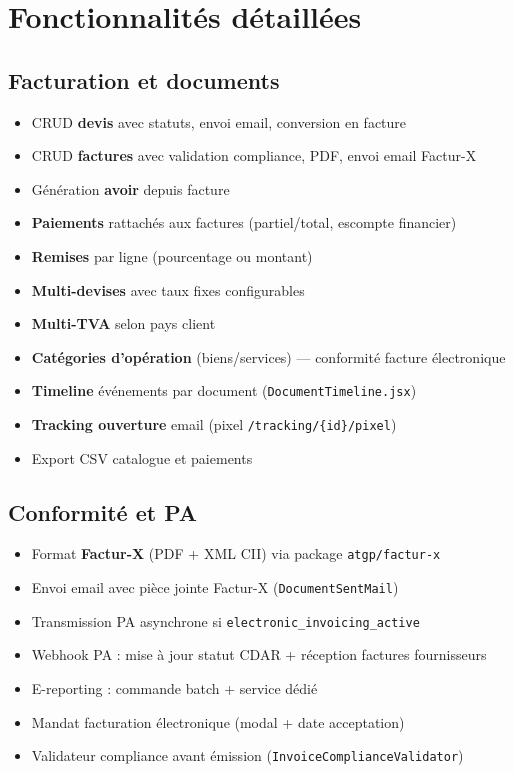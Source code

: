 \documentclass[11pt,a4paper]{report}
\newcommand{\filepath}[1]{\texttt{\small #1}}
\begin{document}
\chapter{Fonctionnalités détaillées}

\section{Facturation et documents}

\begin{itemize}[leftmargin=1.5em]
    \item CRUD \textbf{devis} avec statuts, envoi email, conversion en facture
    \item CRUD \textbf{factures} avec validation compliance, PDF, envoi email Factur-X
    \item Génération \textbf{avoir} depuis facture
    \item \textbf{Paiements} rattachés aux factures (partiel/total, escompte financier)
    \item \textbf{Remises} par ligne (pourcentage ou montant)
    \item \textbf{Multi-devises} avec taux fixes configurables
    \item \textbf{Multi-TVA} selon pays client
    \item \textbf{Catégories d'opération} (biens/services) — conformité facture électronique
    \item \textbf{Timeline} événements par document (\filepath{DocumentTimeline.jsx})
    \item \textbf{Tracking ouverture} email (pixel \texttt{/tracking/\{id\}/pixel})
    \item Export CSV catalogue et paiements
\end{itemize}

\section{Conformité et PA}

\begin{itemize}[leftmargin=1.5em]
    \item Format \textbf{Factur-X} (PDF + XML CII) via package \texttt{atgp/factur-x}
    \item Envoi email avec pièce jointe Factur-X (\filepath{DocumentSentMail})
    \item Transmission PA asynchrone si \texttt{electronic\_invoicing\_active}
    \item Webhook PA : mise à jour statut CDAR + réception factures fournisseurs
    \item E-reporting : commande batch + service dédié
    \item Mandat facturation électronique (modal + date acceptation)
    \item Validateur compliance avant émission (\filepath{InvoiceComplianceValidator})
\end{itemize}
\end{document}
